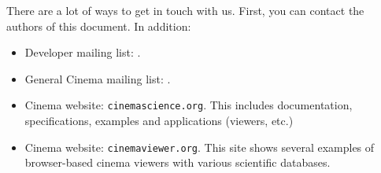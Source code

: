 There are a lot of ways to get in touch with us. First, you can contact the authors of this document. In addition:

\begin{itemize}
\item Developer mailing list: \cdevemail.
\item General Cinema mailing list: \cinemaemail.
\item Cinema website: \texttt{\small cinemascience.org}. This includes documentation, specifications, examples and applications (viewers, etc.)
\item Cinema website: \texttt{\small cinemaviewer.org}. This site shows several examples of browser-based cinema viewers with various scientific databases. 
\end{itemize}
